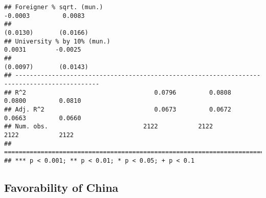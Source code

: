 \documentclass[
]{article}
\begin{document}
\begin{verbatim}
## Foreigner % sqrt. (mun.)                                           -0.0003         0.0083    
##                                                                    (0.0130)       (0.0166)   
## University % by 10% (mun.)                                          0.0031        -0.0025    
##                                                                    (0.0097)       (0.0143)   
## ---------------------------------------------------------------------------------------------
## R^2                                   0.0796         0.0808         0.0800         0.0810    
## Adj. R^2                              0.0673         0.0672         0.0663         0.0660    
## Num. obs.                          2122           2122           2122           2122         
## =============================================================================================
## *** p < 0.001; ** p < 0.01; * p < 0.05; + p < 0.1
\end{verbatim}

\hypertarget{favorability-of-china-2}{%
\subsection{Favorability of China}\label{favorability-of-china-2}}
\end{document}
